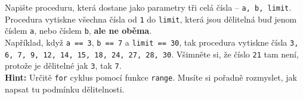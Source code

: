 \question[70]
Napište proceduru, která dostane jako parametry tři celá čísla -- \texttt{a, b,
	limit}. Procedura vytiskne všechna čísla od \texttt{1} do \texttt{limit}, která
jsou dělitelná buď jenom číslem \texttt{a}, nebo číslem \texttt{b}, \textbf{ale
	ne oběma}.\\
Například, když \texttt{a == 3}, \texttt{b == 7} a \texttt{limit == 30}, tak
procedura vytiskne čísla \texttt{3, 6, 7, 9, 12, 14, 15, 18, 24, 27, 28, 30}.
Všimněte si, že číslo \texttt{21} tam není, protože je dělitelné jak \texttt{3},
tak \texttt{7}.\\
\textbf{Hint:} Určitě \texttt{for} cyklus pomocí funkce \texttt{range}. Musíte si
pořadně rozmyslet, jak napsat tu podmínku dělitelnosti.